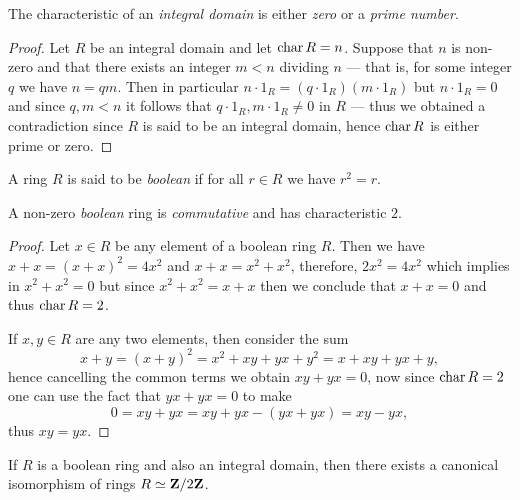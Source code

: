 \begin{proposition}
\label{prop:char-integral-domain-is-0-or-p}
The characteristic of an \emph{integral domain} is either \emph{zero} or a
\emph{prime number}.
\end{proposition}

\begin{proof}
Let \(R\) be an integral domain and let \(\operatorname{char} R = n\). Suppose that \(n\) is
non-zero and that there exists an integer \(m < n\) dividing \(n\) --- that is,
for some integer \(q\) we have \(n = q m\). Then in particular
\(n \cdot 1_R = (q \cdot 1_R) (m \cdot 1_R)\) but \(n \cdot 1_R = 0\) and since
\(q, m < n\) it follows that \(q \cdot 1_R, m \cdot 1_R \neq 0\) in \(R\) ---
thus we obtained a contradiction since \(R\) is said to be an integral domain,
hence \(\operatorname{char} R\) is either prime or zero.
\end{proof}

\begin{definition}
\label{def:boolean-ring}
A ring \(R\) is said to be \emph{boolean} if for all \(r \in R\) we have
\(r^2 = r\).
\end{definition}

\begin{corollary}
\label{cor:boolean-is-commutative-and-char-2}
A non-zero \emph{boolean} ring is \emph{commutative} and has characteristic
\(2\).
\end{corollary}

\begin{proof}
Let \(x \in R\) be any element of a boolean ring \(R\). Then we have
\(x + x = (x + x)^2 = 4 x^2\) and \(x + x = x^2 + x^2\), therefore,
\(2 x^2 = 4 x^2\) which implies in \(x^2 + x^2 = 0\) but since
\(x^2 + x^2 = x + x\) then we conclude that \(x + x = 0\) and thus
\(\operatorname{char} R = 2\).

If \(x, y \in R\) are any two elements, then consider the sum
\[
x + y
= (x + y)^2
= x^2 + x y + y x + y^2
= x + x y + y x + y,
\]
hence cancelling the common terms we obtain \(x y + y x = 0\), now since
\(\operatorname{char} R = 2\) one can use the fact that \(y x + yx = 0\) to make
\[
0 = x y + y x = x y + y x - (y x + y x) = x y - y x,
\]
thus \(x y = y x\).
\end{proof}

\begin{corollary}
\label{cor:boolean-integral-domain-is-Z/2Z}
If \(R\) is a boolean ring and also an integral domain, then there exists a
canonical isomorphism of rings \(R \simeq \mathbf{Z}/2\mathbf{Z}\).
\end{corollary}

